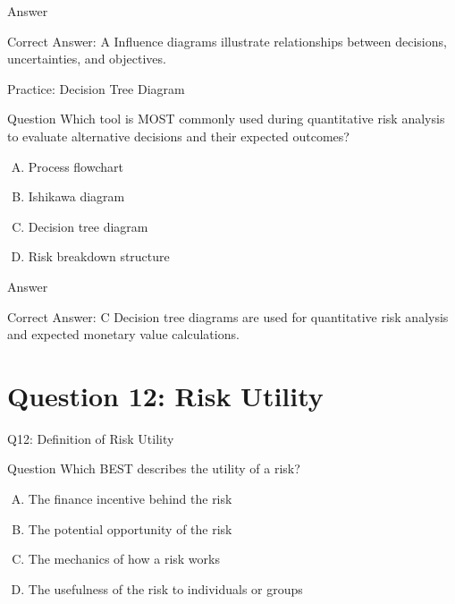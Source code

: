 \documentclass{beamer}
\begin{document}
	\begin{frame}{Answer}
		\begin{block}{Correct Answer: A}
			Influence diagrams illustrate relationships between decisions, uncertainties, and objectives.
		\end{block}
	\end{frame}
	
	\begin{frame}{Practice: Decision Tree Diagram}
		\begin{block}{Question}
			Which tool is MOST commonly used during quantitative risk analysis to evaluate alternative decisions and their expected outcomes?
		\end{block}
		\begin{enumerate}[(A)]
			\item Process flowchart
			\item Ishikawa diagram
			\item Decision tree diagram
			\item Risk breakdown structure
		\end{enumerate}
	\end{frame}
	
	\begin{frame}{Answer}
		\begin{block}{Correct Answer: C}
			Decision tree diagrams are used for quantitative risk analysis and expected monetary value calculations.
		\end{block}
	\end{frame}
	
	
	
	
	\section{Question 12: Risk Utility}
	
	\begin{frame}{Q12: Definition of Risk Utility}
		\begin{block}{Question}
			Which BEST describes the utility of a risk?
		\end{block}
		\begin{enumerate}[(A)]
			\item The finance incentive behind the risk
			\item The potential opportunity of the risk
			\item The mechanics of how a risk works
			\item The usefulness of the risk to individuals or groups
		\end{enumerate}
	\end{frame}
	
\end{document}
